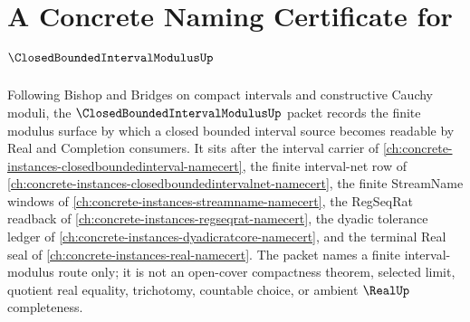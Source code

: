 \chapter{A Concrete Naming Certificate for $\ClosedBoundedIntervalModulusUp$}
\label{ch:concrete-instances-closed-bounded-interval-modulus-namecert}

Following Bishop and Bridges on compact intervals and constructive Cauchy moduli, the $\ClosedBoundedIntervalModulusUp$ packet records the finite modulus surface by which a closed bounded interval source becomes readable by Real and Completion consumers. It sits after the interval carrier of \autoref{ch:concrete-instances-closedboundedinterval-namecert}, the finite interval-net row of \autoref{ch:concrete-instances-closedboundedintervalnet-namecert}, the finite StreamName windows of \autoref{ch:concrete-instances-streamname-namecert}, the RegSeqRat readback of \autoref{ch:concrete-instances-regseqrat-namecert}, the dyadic tolerance ledger of \autoref{ch:concrete-instances-dyadicratcore-namecert}, and the terminal Real seal of \autoref{ch:concrete-instances-real-namecert}. The packet names a finite interval-modulus route only; it is not an open-cover compactness theorem, selected limit, quotient real equality, trichotomy, countable choice, or ambient $\RealUp$ completeness.

